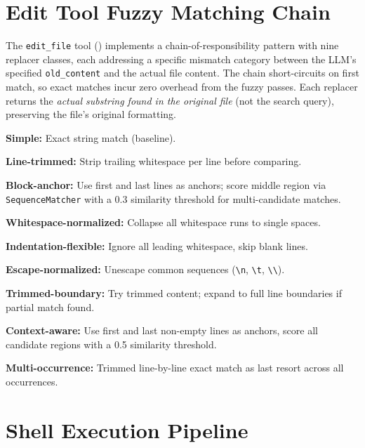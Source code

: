 \section{Edit Tool Fuzzy Matching Chain}
\label{app:fuzzy}

The \texttt{edit\_file} tool () implements a chain-of-responsibility pattern with nine replacer classes, each addressing a specific mismatch category between the LLM's specified \texttt{old\_content} and the actual file content. The chain short-circuits on first match, so exact matches incur zero overhead from the fuzzy passes. Each replacer returns the \emph{actual substring found in the original file} (not the search query), preserving the file's original formatting.

\begin{packedenumerate}
\item \textbf{Simple:} Exact string match (baseline).
\item \textbf{Line-trimmed:} Strip trailing whitespace per line before comparing.
\item \textbf{Block-anchor:} Use first and last lines as anchors; score middle region via \texttt{SequenceMatcher} with a 0.3 similarity threshold for multi-candidate matches.
\item \textbf{Whitespace-normalized:} Collapse all whitespace runs to single spaces.
\item \textbf{Indentation-flexible:} Ignore all leading whitespace, skip blank lines.
\item \textbf{Escape-normalized:} Unescape common sequences (\texttt{\textbackslash n}, \texttt{\textbackslash t}, \texttt{\textbackslash\textbackslash}).
\item \textbf{Trimmed-boundary:} Try trimmed content; expand to full line boundaries if partial match found.
\item \textbf{Context-aware:} Use first and last non-empty lines as anchors, score all candidate regions with a 0.5 similarity threshold.
\item \textbf{Multi-occurrence:} Trimmed line-by-line exact match as last resort across all occurrences.
\end{packedenumerate}


\section{Shell Execution Pipeline}
\label{app:bash}

